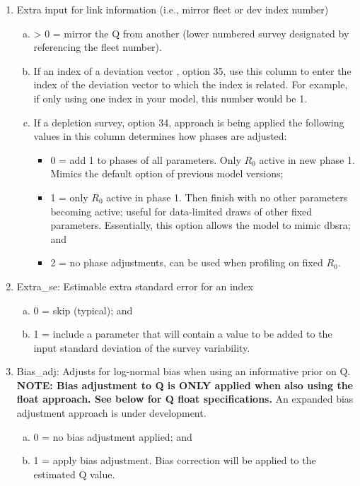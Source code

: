 \begin{enumerate}
\begin{enumerate}[(a)]
	\end{enumerate}
	\item \hypertarget{link_info}{Extra input for link information (i.e., mirror fleet or dev index number)}
	\begin{enumerate}[(a)]
		\item > 0 = mirror the Q from another (lower numbered survey designated by referencing the fleet number).
		\item If an index of a deviation vector , option 35, use this column to enter the index of the deviation vector to which the index is related. For example, if only using one index in your model, this number would be 1.
		\item If a depletion survey, option 34, approach is being applied the following values in this column determines how phases are adjusted:
		\begin{itemize}
			\item 0 = add 1 to phases of all parameters. Only $R_{0}$ active in new phase 1. Mimics the default option of previous model versions;
			\item 1 = only $R_{0}$ active in phase 1. Then finish with no other parameters becoming active; useful for data-limited draws of other fixed parameters. Essentially, this option allows the model to mimic \gls{dbsra}; and
			\item 2 = no phase adjustments, can be used when profiling on fixed $R_{0}$.
		\end{itemize}
	\end{enumerate}
	\item Extra\_se: Estimable extra standard error for an index
	\begin{enumerate}[(a)]
		\item 0 = skip (typical); and
		\item 1 = include a parameter that will contain a value to be added to the input standard deviation of the survey variability.
	\end{enumerate}
	\item Bias\_adj: Adjusts for log-normal bias when using an informative prior on Q. \textbf{NOTE: Bias adjustment to Q is ONLY applied when also using the float approach. See below for Q float specifications.} An expanded bias adjustment approach is under development.
	\begin{enumerate}[(a)]
		\item 0 = no bias adjustment applied; and
		\item 1 = apply bias adjustment. Bias correction will be applied to the estimated Q value.

\end{enumerate}
\end{enumerate}
